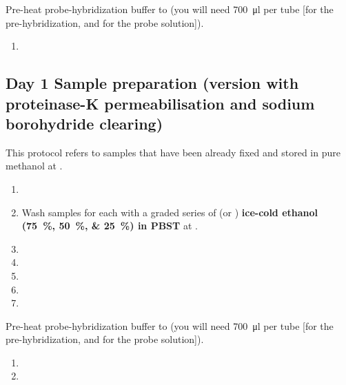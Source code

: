 \documentclass[10pt]{report}
\begin{document}
\bigskip\alert{Pre-heat probe-hybridization buffer to \thirtysevendegree{} (you will need \qty{700}{\ul} per tube [\fivehunmicrol for the pre-hybridization, and \twohunmicrol{} for the probe solution]).}

\begin{enumerate}[resume = steps]
	\item {}
\end{enumerate}

\subsection*{Day 1 \textendash{} Sample preparation (version with proteinase-K permeabilisation and sodium borohydride clearing)}

\alert{This protocol refers to samples that have been already fixed and stored in pure methanol at \minustwenty.}

\begin{enumerate}[series = steps]
	\item {}
	\item Wash samples for \underline{\quarter} each with a graded series of \fivehunmicrol{} (or \onemil) \textbf{ice-cold ethanol (\qtylist{75;50;25}{\percent}) in PBST} at \fourdegree.
	\item {}
	\item {}
	\item {}
	\item {}
	\item {}
\end{enumerate}

\bigskip\alert{Pre-heat probe-hybridization buffer to \thirtysevendegree{} (you will need \qty{700}{\ul} per tube [\fivehunmicrol for the pre-hybridization, and \twohunmicrol{} for the probe solution]).}

\begin{enumerate}[resume = steps]
	\item {}
	\item {}
\end{enumerate}
\end{document}
